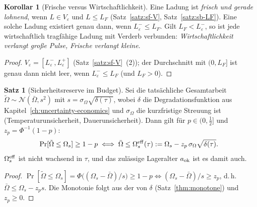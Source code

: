 \documentclass[a4paper, 12pt, twoside, openright]{report}
\theoremstyle{definition}
\theoremstyle{definition}
\newtheorem{satz}{Satz}[chapter]
\newtheorem{korollar}{Korollar}[chapter]
\begin{document}
\begin{korollar}[Frische versus Wirtschaftlichkeit]\label{kor:sb-F-wirtschaft}
Eine Ladung ist \emph{frisch und gerade lohnend}, wenn $L\in V_\varepsilon$ und $L\le L_F$
(Satz~\ref{satz:sf-V}, Satz~\ref{satz:sb-LF}). Eine solche Ladung existiert genau dann, wenn
$L_\varepsilon^-\le L_F$. Gilt $L_F<L_\varepsilon^-$, so ist jede wirtschaftlich tragfähige
Ladung mit Verderb verbunden: \emph{Wirtschaftlichkeit verlangt große Pulse, Frische
verlangt kleine}.
\end{korollar}

\begin{proof}
$V_\varepsilon=[L_\varepsilon^-,L_\varepsilon^+]$ (Satz~\ref{satz:sf-V}~(2)); der Durchschnitt mit
$(0,L_F]$ ist genau dann nicht leer, wenn $L_\varepsilon^-\le L_F$ (und $L_F>0$).
\end{proof}

\begin{satz}[Sicherheitsreserve im Budget]\label{satz:sb-chance}
Sei die tatsächliche Gesamtarbeit $\tilde\Omega\sim\mathcal N(\bar\Omega,s^2)$ mit
$s=\sigma_\Omega\sqrt{\delta(\tau)}$, wobei $\delta$ die Degradationsfunktion aus
Kapitel~\ref{ch:uncertainty-economics} und $\sigma_\Omega$ die kurzfristige Streuung ist
(Temperaturunsicherheit, Dauerunsicherheit). Dann gilt für $p\in(0,\tfrac12]$ und $z_p=\Phi^{-1}(1-p)$:
\begin{equation}
  \Pr[\tilde\Omega\le\Omega_s]\ge1-p\iff\bar\Omega\le\Omega_s^{\rm eff}(\tau):=\Omega_s-z_p\,\sigma_\Omega\sqrt{\delta(\tau)}.
  \label{eq:sb-Oseff}
\end{equation}
$\Omega_s^{\rm eff}$ ist nicht wachsend in $\tau$, und das zulässige Lageralter $a_{\rm ok}$ ist es
damit auch.
\end{satz}

\begin{proof}
$\Pr[\tilde\Omega\le\Omega_s]=\Phi\bigl((\Omega_s-\bar\Omega)/s\bigr)\ge1-p\iff(\Omega_s-\bar\Omega)/s\ge z_p$,
d.\,h.\ $\bar\Omega\le\Omega_s-z_ps$. Die Monotonie folgt aus der von $\delta$
(Satz~\ref{thm:monotone}) und $z_p\ge0$.
\end{proof}
\end{document}
